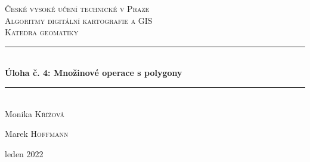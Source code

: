 \documentclass[11pt]{article}
\begin{document}

\begin{titlepage} %
	\newcommand{\HRule}{\rule{\linewidth}{0.5mm}} %
	
	\center %
	
	
	\textsc{\LARGE České vysoké učení technické v Praze}\\[1.5cm] %
	
	\textsc{\Large Algoritmy digitální kartografie a GIS}\\[0.5cm] %
	
	\textsc{\large Katedra geomatiky}\\[0.5cm] %
	
	
	\HRule\\[0.4cm]
	
	{\huge\bfseries Úloha č. 4: Množinové operace s polygony}\\[0.4cm] %
	
	\HRule\\[1.5cm]
	
	
	

	
	Monika \textsc{Křížová} %
	
	Marek \textsc{Hoffmann}
	
	
	\vfill\vfill\vfill %
	
	{\large leden 2022} %
	
	
	 
	
	\vfill %
	
\end{titlepage}
\end{document}
